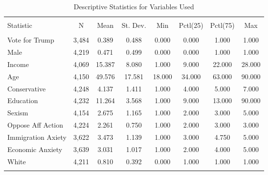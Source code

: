 
\begin{table}[!htbp] \centering 
  \caption{Descriptive Statistics for Variables Used} 
  \label{tab: desc} 
\begin{tabular}{@{\extracolsep{5pt}}lccccccc} 
\\[-1.8ex]\hline 
\hline \\[-1.8ex] 
Statistic & \multicolumn{1}{c}{N} & \multicolumn{1}{c}{Mean} & \multicolumn{1}{c}{St. Dev.} & \multicolumn{1}{c}{Min} & \multicolumn{1}{c}{Pctl(25)} & \multicolumn{1}{c}{Pctl(75)} & \multicolumn{1}{c}{Max} \\ 
\hline \\[-1.8ex] 
Vote for Trump & 3,484 & 0.389 & 0.488 & 0.000 & 0.000 & 1.000 & 1.000 \\ 
Male & 4,219 & 0.471 & 0.499 & 0.000 & 0.000 & 1.000 & 1.000 \\ 
Income & 4,069 & 15.387 & 8.080 & 1.000 & 9.000 & 22.000 & 28.000 \\ 
Age & 4,150 & 49.576 & 17.581 & 18.000 & 34.000 & 63.000 & 90.000 \\ 
Conservative & 4,248 & 4.137 & 1.411 & 1.000 & 4.000 & 5.000 & 7.000 \\ 
Education & 4,232 & 11.264 & 3.568 & 1.000 & 9.000 & 13.000 & 90.000 \\ 
Sexism & 4,154 & 2.675 & 1.165 & 1.000 & 2.000 & 3.000 & 5.000 \\ 
Oppose Aff Action & 4,224 & 2.261 & 0.750 & 1.000 & 2.000 & 3.000 & 3.000 \\ 
Immigration Axiety & 3,622 & 3.473 & 1.139 & 1.000 & 3.000 & 4.750 & 5.000 \\ 
Economic Anxiety & 3,639 & 3.031 & 1.017 & 1.000 & 2.000 & 4.000 & 5.000 \\ 
White & 4,211 & 0.810 & 0.392 & 0.000 & 1.000 & 1.000 & 1.000 \\ 
\hline \\[-1.8ex] 
\end{tabular} 
\end{table} 
